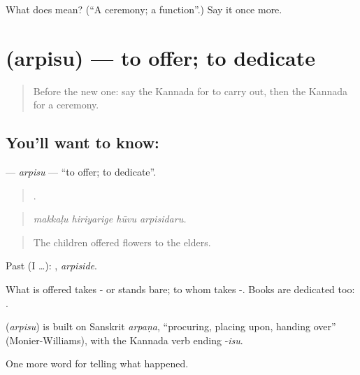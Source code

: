 \begin{tcolorbox}[breakable,colback=teal!4,colframe=teal!35!black,title={Before you move on}]
What does  mean? (\textquotedblleft{}A ceremony; a function\textquotedblright{}.) Say it once more.
\end{tcolorbox}
\section[\texorpdfstring{\kn{ಅರ್ಪಿಸು} (arpisu)}{ಅರ್ಪಿಸು (arpisu)}]{ (arpisu) — to offer; to dedicate}

\label{lesson:KA-C333-arpisu}



\begin{quote}
Before the new one: say the Kannada for to carry out, then the Kannada for a ceremony.
\end{quote}

\subsection*{You'll want to know: }
\textbf{} — \emph{arpisu} — \textquotedblleft{}to offer; to dedicate\textquotedblright{}.

\begin{quote}
   .
\end{quote}

\begin{quote}
\emph{makkaḷu hiriyarige hūvu arpisidaru.}
\end{quote}

\begin{quote}
The children offered flowers to the elders.
\end{quote}

Past (I …): , \emph{arpiside}.

What is offered takes - or stands bare; to whom takes -. Books are dedicated too:   .

\begin{cousinweb}
\textbf{} (\emph{arpisu}) is built on Sanskrit \emph{arpaṇa}, \textquotedblleft{}procuring, placing upon, handing over\textquotedblright{} (Monier-Williams), with the Kannada verb ending -\emph{isu}.
\end{cousinweb}

\begin{grammarlens}[title={What you've built}]
One more word for telling what happened.
\end{grammarlens}

